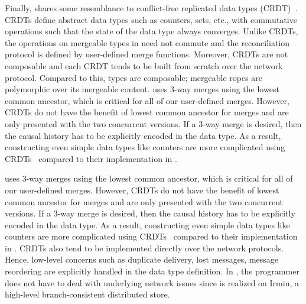 Finally, \name shares some resemblance to conflict-free replicated
data types (CRDT)~\cite{crdt}. CRDTs define abstract data types such
as counters, sets, etc., with commutative operations such that the
state of the data type always converges. Unlike CRDTs, the operations
on mergeable types in \name need not commute and the reconciliation
protocol is defined by user-defined merge functions. Moreover, CRDTs
are not composable and each CRDT tends to be built from scratch over
the network protocol. Compared to this, \name types are composable;
mergeable ropes are polymorphic over its mergeable content. \name uses
3-way merges using the lowest common ancestor, which is critical for
all of our user-defined merges. However, CRDTs do not have the benefit
of lowest common ancestor for merges and are only presented with the
two concurrent versions. If a 3-way merge is desired, then the causal
history has to be explicitly encoded in the data type. As a result,
constructing even simple data types like counters are more complicated
using CRDTs~\cite{crdt} compared to their implementation in \name.

\name uses 3-way merges using the lowest common ancestor, which is critical for
all of our user-defined merges. However, CRDTs do not have the benefit of
lowest common ancestor for merges and are only presented with the two
concurrent versions. If a 3-way merge is desired, then the causal history has
to be explicitly encoded in the data type. As a result, constructing even
simple data types like counters are more complicated using CRDTs~\cite{crdt}
compared to their implementation in \name. CRDTs also tend to be implemented
directly over the network protocols. Hence, low-level concerns such as
duplicate delivery, lost messages, message reordering are explicitly handled in
the data type definition. In \name, the programmer does not have to deal with
underlying network issues since \name is realized on Irmin, a high-level
branch-consistent distributed store.
